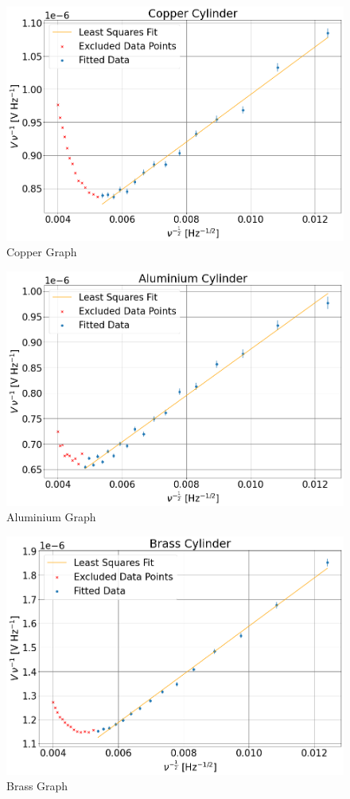 \documentclass[a4paper,12pt,twocolumn]{article}
\begin{document}
	\begin{figure}
		\centering
		\includegraphics[scale=0.4]{copperGraph.png}
		\captionsetup{font=scriptsize}
		\caption{Copper Graph}
		\label{fig:copperGraph}
	\end{figure}
	\begin{figure}
		\centering
		\includegraphics[scale=0.4]{aluminiumGraph.png}
		\captionsetup{font=scriptsize}
		\caption{Aluminium Graph}
		\label{fig:aluminiumGraph}
	\end{figure}
	\begin{figure}
		\centering
		\includegraphics[scale=0.4]{brassGraph.png}
		\captionsetup{font=scriptsize}
		\caption{Brass Graph}
		\label{fig:brassGraph}
	\end{figure}
\end{document}
